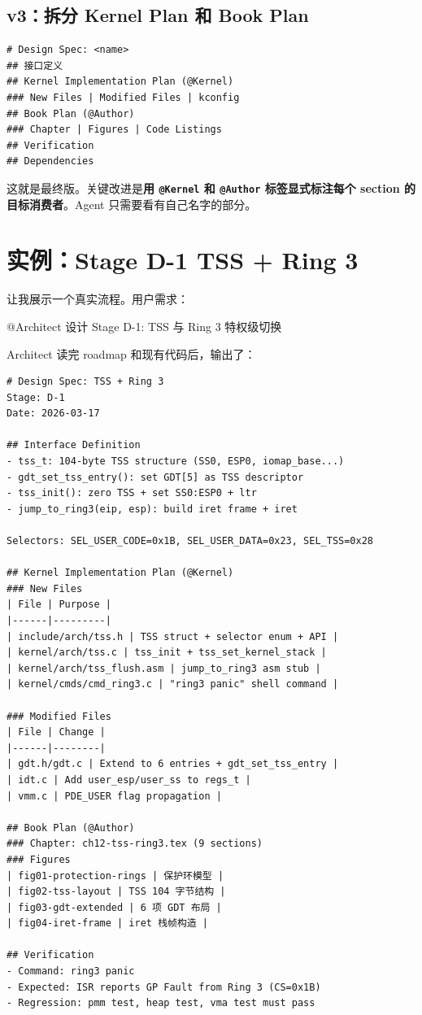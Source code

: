 \subsection{v3：拆分 Kernel Plan 和 Book Plan}

\begin{lstlisting}[style=yamlstyle]
# Design Spec: <name>
## 接口定义
## Kernel Implementation Plan (@Kernel)
### New Files | Modified Files | kconfig
## Book Plan (@Author)
### Chapter | Figures | Code Listings
## Verification
## Dependencies
\end{lstlisting}

这就是最终版。关键改进是\textbf{用 \texttt{@Kernel} 和 \texttt{@Author} 标签显式标注每个 section 的目标消费者}。Agent 只需要看有自己名字的部分。

\section{实例：Stage D-1 TSS + Ring 3}

让我展示一个真实流程。用户需求：

\begin{humanmsg}
@Architect 设计 Stage D-1: TSS 与 Ring 3 特权级切换
\end{humanmsg}

Architect 读完 roadmap 和现有代码后，输出了：

\begin{lstlisting}[style=yamlstyle]
# Design Spec: TSS + Ring 3
Stage: D-1
Date: 2026-03-17

## Interface Definition
- tss_t: 104-byte TSS structure (SS0, ESP0, iomap_base...)
- gdt_set_tss_entry(): set GDT[5] as TSS descriptor
- tss_init(): zero TSS + set SS0:ESP0 + ltr
- jump_to_ring3(eip, esp): build iret frame + iret

Selectors: SEL_USER_CODE=0x1B, SEL_USER_DATA=0x23, SEL_TSS=0x28

## Kernel Implementation Plan (@Kernel)
### New Files
| File | Purpose |
|------|---------|
| include/arch/tss.h | TSS struct + selector enum + API |
| kernel/arch/tss.c | tss_init + tss_set_kernel_stack |
| kernel/arch/tss_flush.asm | jump_to_ring3 asm stub |
| kernel/cmds/cmd_ring3.c | "ring3 panic" shell command |

### Modified Files
| File | Change |
|------|--------|
| gdt.h/gdt.c | Extend to 6 entries + gdt_set_tss_entry |
| idt.c | Add user_esp/user_ss to regs_t |
| vmm.c | PDE_USER flag propagation |

## Book Plan (@Author)
### Chapter: ch12-tss-ring3.tex (9 sections)
### Figures
| fig01-protection-rings | 保护环模型 |
| fig02-tss-layout | TSS 104 字节结构 |
| fig03-gdt-extended | 6 项 GDT 布局 |
| fig04-iret-frame | iret 栈帧构造 |

## Verification
- Command: ring3 panic
- Expected: ISR reports GP Fault from Ring 3 (CS=0x1B)
- Regression: pmm test, heap test, vma test must pass
\end{lstlisting}

